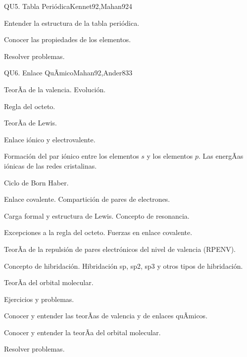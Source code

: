 \begin{syllabus}
\begin{unit}{QU5. Tabla Periódica}{Kennet92,Mahan92}{4}
   \begin{unitgoals}
      \item Entender la estructura de la tabla periódica.
      \item Conocer las propiedades de los elementos.
      \item Resolver problemas.
   \end{unitgoals}
\end{unit}

\begin{unit}{QU6. Enlace QuÃ­mico}{Mahan92,Ander83}{3}
   \begin{topics}
	\item TeorÃ­a de  la valencia. Evolución.
	\item Regla del octeto.
	\item TeorÃ­a de Lewis.
	\item Enlace iónico y electrovalente.
	\item Formación del par iónico entre los elementos $s$ y los elementos $p$. Las energÃ­as iónicas de las redes cristalinas.
	\item Ciclo de Born Haber.
	\item Enlace covalente. Compartición de pares de electrones.
	\item Carga formal y estructura de Lewis. Concepto de resonancia.
	\item Excepciones a la regla del octeto. Fuerzas en enlace covalente.
	\item TeorÃ­a de la repulsión de pares electrónicos del nivel de valencia (RPENV).
	\item Concepto de hibridación. Hibridación sp, sp2, sp3 y otros tipos de hibridación.
	\item TeorÃ­a del orbital molecular.
	\item Ejercicios y problemas.
   \end{topics}

   \begin{unitgoals}
      \item Conocer y entender las teorÃ­as de valencia y de enlaces quÃ­micos.
      \item Conocer y entender la teorÃ­a del orbital molecular.
      \item Resolver problemas.
   \end{unitgoals}
\end{unit}


\end{syllabus}
